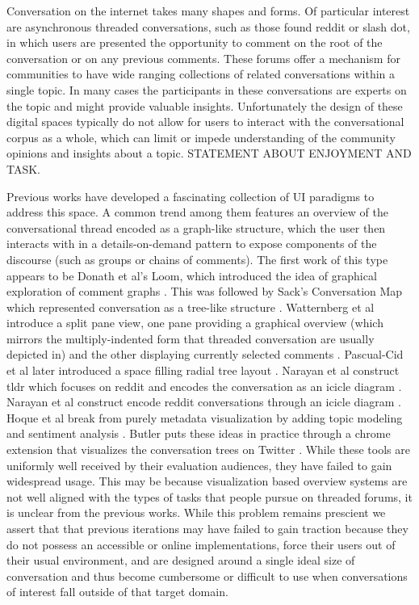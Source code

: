 \documentclass{egpubl}
\begin{document}
Conversation on the internet takes many shapes and forms. 
%
Of particular interest are asynchronous threaded conversations, such as those found reddit or slash dot, in which users are presented the opportunity to comment on the root of the conversation or on any previous comments. 
%
These forums offer a mechanism for communities to have wide ranging collections of related conversations within a single topic.
%
In many cases the participants in these conversations are experts on the topic and might provide valuable insights.
%
Unfortunately the design of these digital spaces typically do not allow for users to interact with the conversational corpus as a whole, which can limit or impede understanding of the community opinions and insights about a topic.
%
STATEMENT ABOUT ENJOYMENT AND TASK.



Previous works have developed a fascinating collection of UI paradigms to address this space. 
%
A common trend among them features an overview of the conversational thread encoded as a graph-like structure, which the user then interacts with in a details-on-demand \cite{shneiderman1996eyes} pattern to expose components of the discourse (such as groups or chains of comments). 
%
 The first work of this type appears to be Donath et al's Loom, which introduced the idea of graphical exploration of comment graphs \cite{donath1999visualizing}. 
 This was followed by Sack's Conversation Map which represented conversation as a tree-like structure \cite{sack2000conversation}. 
 Watternberg et al introduce a split pane view, one pane providing a graphical overview (which mirrors the multiply-indented form that threaded conversation are usually depicted in) and the other displaying currently selected comments \cite{wattenberg2003conversation, dave2004flash}.
% 
Pascual-Cid et al later introduced a space filling radial tree layout \cite{pascual2009exploring}. 
%
Narayan et al construct tldr which focuses on reddit and encodes the conversation as an icicle diagram \cite{narayan2010not}. 
Narayan et al construct encode reddit conversations through an icicle diagram \cite{narayan2010not}. 
%
Hoque et al break from purely metadata visualization by adding topic modeling and sentiment analysis  \cite{hoque2014convis, hoque2016interactive}.
%
Butler puts these ideas in practice through a chrome extension that visualizes the conversation trees on Twitter \cite{treeverse}.
%
While these tools are uniformly well received by their evaluation audiences, they have failed to gain widespread usage.
%
This may be because visualization based overview systems are not well aligned with the types of tasks that people pursue on threaded forums, it is unclear from the previous works.
%
While this problem remains prescient we assert that that previous iterations may have failed to gain traction because they do not possess an accessible or online implementations, force their users out of their usual environment, and are designed around a single ideal size of conversation and thus become cumbersome or difficult to use when conversations of interest fall outside of that target domain.
\end{document}
